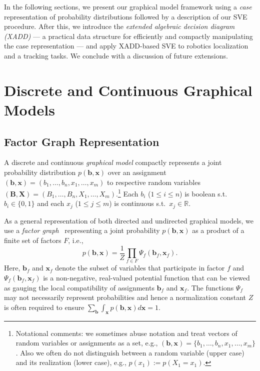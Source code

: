 \documentclass[letterpaper]{article}
\newcommand{\R}{\mathbb{R}}
\renewcommand{\vec}[1]{\mathbf{#1}}
\begin{document}
In the following sections, we present our graphical model
framework using a \emph{case} representation of probability
distributions followed by a description of our SVE procedure.  
After this, we introduce
the \emph{extended algebraic decision diagram (XADD)} --- a practical
data structure for efficiently and compactly manipulating the case
representation --- and apply XADD-based SVE to robotics localization 
and a tracking tasks.  We conclude with a discussion of future 
extensions.

\section{Discrete and Continuous Graphical Models}

\subsection{Factor Graph Representation}

A discrete and continuous \emph{graphical model} compactly represents
a joint probability distribution $p(\vec{b},\vec{x})$ over an
assignment $(\vec{b},\vec{x}) = ( b_1,\ldots,b_n,x_{1},\ldots,x_m )$
to respective random variables $(\vec{B},\vec{X}) =
(B_1,\ldots,B_n,X_{1},\ldots,X_m )$.\footnote{Notational comments:
we sometimes abuse notation and treat
vectors of random variables or assignments as a set, e.g., 
$(\vec{b},\vec{x}) = \{ b_1,\ldots,b_n,x_1,\ldots,x_m \}$.  
Also we often do
not distinguish between a random variable (upper case) and its
realization (lower case), e.g., $p(x_1) := p(X_1 = x_1)$.}  Each $b_i$
($1 \leq i \leq n$) is boolean s.t.\ $b_i \in \{ 0,1 \}$ and each
$x_j$ ($1 \leq j \leq m$) is continuous s.t.\ $x_j \in \R$.

As a general representation of both directed and undirected graphical
models, we use a \emph{factor graph}~\cite{factor_graph} 
representing a joint probability $p(\vec{b},\vec{x})$ as a
product of a finite set of factors $F$, i.e.,
\begin{equation}
p(\vec{b},\vec{x}) = \frac{1}{Z} \prod_{f \in F} \Psi_f(\vec{b}_f,\vec{x}_f).
\label{eq:fg}
\end{equation}
Here, $\vec{b}_f$ and $\vec{x}_f$ denote the subset of variables that
participate in factor $f$ and $\Psi_f(\vec{b}_f,\vec{x}_f)$ is a 
non-negative, real-valued 
potential function that can be viewed as gauging the local
compatibility of assignments $\vec{b}_f$ and $\vec{x}_f$.  
The functions $\Psi_f$ may not necessarily represent probabilities and
hence a normalization constant $Z$ is often required to ensure
$\sum_{\vec{b}} \int_{\vec{x}} p(\vec{b},\vec{x}) d\vec{x} = 1$.
\end{document}
